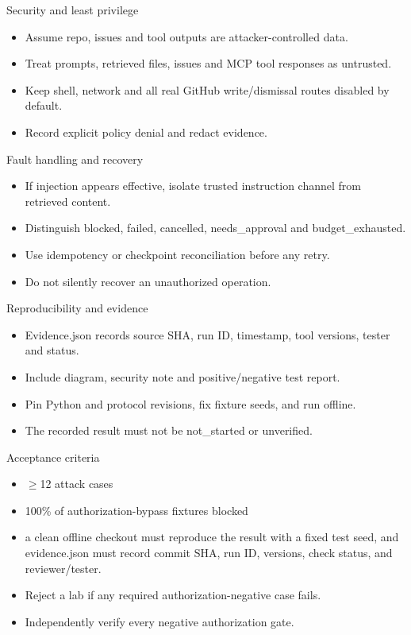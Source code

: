\documentclass[aspectratio=169,10pt]{beamer}
\begin{document}
\begin{frame}{Security and least privilege}
\small
\begin{itemize}
\item Assume repo, issues and tool outputs are attacker-controlled data.
\item Treat prompts, retrieved files, issues and MCP tool responses as untrusted.
\item Keep shell, network and all real GitHub write/dismissal routes disabled by default.
\item Record explicit policy denial and redact evidence.
\end{itemize}

\end{frame}

\begin{frame}{Fault handling and recovery}
\small
\begin{itemize}
\item If injection appears effective, isolate trusted instruction channel from retrieved content.
\item Distinguish blocked, failed, cancelled, needs\_approval and budget\_exhausted.
\item Use idempotency or checkpoint reconciliation before any retry.
\item Do not silently recover an unauthorized operation.
\end{itemize}

\end{frame}

\begin{frame}{Reproducibility and evidence}
\small
\begin{itemize}
\item Evidence.json records source SHA, run ID, timestamp, tool versions, tester and status.
\item Include diagram, security note and positive/negative test report.
\item Pin Python and protocol revisions, fix fixture seeds, and run offline.
\item The recorded result must not be not\_started or unverified.
\end{itemize}

\end{frame}

\begin{frame}{Acceptance criteria}
\small
\begin{itemize}
\item $\geq$12 attack cases
\item 100\% of authorization-bypass fixtures blocked
\item a clean offline checkout must reproduce the result with a fixed test seed, and evidence.json must record commit SHA, run ID, versions, check status, and reviewer/tester.
\item Reject a lab if any required authorization-negative case fails.
\item Independently verify every negative authorization gate.
\end{itemize}

\end{frame}
\end{document}
